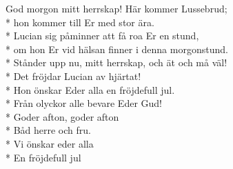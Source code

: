 \begin{SongText}
    \begin{SongVerse}
        God morgon mitt herrskap! Här kommer Lussebrud;\\*%
        hon kommer till Er med stor ära.\\*%
        Lucian sig påminner att få roa Er en stund,\\*%
        om hon Er vid hälsan finner i denna morgonstund.\\*%
        Stånder upp nu, mitt herrskap, och ät och må väl!\\*%
        Det fröjdar Lucian av hjärtat!\\*%
        Hon önskar Eder alla en fröjdefull jul.\\*%
        Från olyckor alle bevare Eder Gud!\\*%
        Goder afton, goder afton\\*%
        Båd herre och fru.\\*%
        Vi önskar eder alla\\*%
        En fröjdefull jul
    \end{SongVerse}
\end{SongText}
